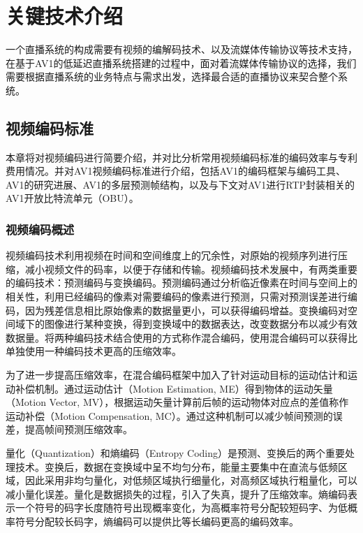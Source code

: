 
\chapter{关键技术介绍}

一个直播系统的构成需要有视频的编解码技术、以及流媒体传输协议等技术支持，在基于AV1的低延迟直播系统搭建的过程中，面对着流媒体传输协议的选择，我们需要根据直播系统的业务特点与需求出发，选择最合适的直播协议来契合整个系统。

\section{视频编码标准}

本章将对视频编码进行简要介绍，并对比分析常用视频编码标准的编码效率与专利费用情况。并对AV1视频编码标准进行介绍，包括AV1的编码框架与编码工具、AV1的研究进展、AV1的多层预测帧结构，以及与下文对AV1进行RTP封装相关的AV1开放比特流单元（OBU）。
\subsection{视频编码概述}

视频编码技术利用视频在时间和空间维度上的冗余性，对原始的视频序列进行压缩，减小视频文件的码率，以便于存储和传输。视频编码技术发展中，有两类重要的编码技术：预测编码与变换编码。预测编码通过分析临近像素在时间与空间上的相关性，利用已经编码的像素对需要编码的像素进行预测，只需对预测误差进行编码，因为残差信息相比原始像素的数据量更小，可以获得编码增益。变换编码对空间域下的图像进行某种变换，得到变换域中的数据表达，改变数据分布以减少有效数据量。将两种编码技术结合使用的方式称作混合编码，使用混合编码可以获得比单独使用一种编码技术更高的压缩效率。

为了进一步提高压缩效率，在混合编码框架中加入了针对运动目标的运动估计和运动补偿机制。通过运动估计（Motion Estimation, ME）得到物体的运动矢量（Motion Vector, MV），根据运动矢量计算前后帧的运动物体对应点的差值称作运动补偿（Motion Compensation, MC）。通过这种机制可以减少帧间预测的误差，提高帧间预测压缩效率。

量化（Quantization）和熵编码（Entropy Coding）是预测、变换后的两个重要处理技术。变换后，数据在变换域中呈不均匀分布，能量主要集中在直流与低频区域，因此采用非均匀量化，对低频区域执行细量化，对高频区域执行粗量化，可以减小量化误差。量化是数据损失的过程，引入了失真，提升了压缩效率。熵编码表示一个符号的码字长度随符号出现概率变化，为高概率符号分配较短码字、为低概率符号分配较长码字，熵编码可以提供比等长编码更高的编码效率。

